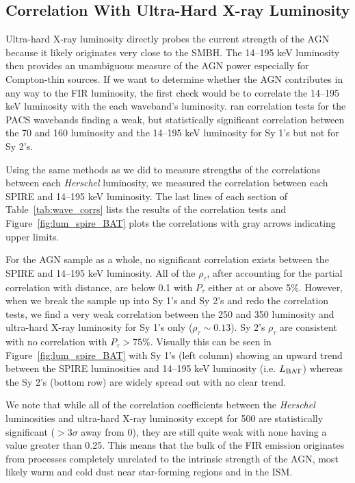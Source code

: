 \subsection{Correlation With Ultra-Hard X-ray Luminosity}
Ultra-hard X-ray luminosity directly probes the current strength of the AGN because it likely originates very close to the SMBH. The 14--195 keV luminosity then provides an unambiguous measure of the AGN power especially for Compton-thin sources. If we want to determine whether the AGN contributes in any way to the FIR luminosity, the first check would be to correlate the 14--195 keV luminosity with the each waveband's luminosity. \citet{Melendez:2014yu} ran correlation tests for the PACS wavebands finding a weak, but statistically significant correlation between the 70 and 160 \um{} luminosity and the 14--195 keV luminosity for Sy 1's but not for Sy 2's.

Using the same methods as we did to measure strengths of the correlations between each \textit{Herschel} luminosity, we measured the correlation between each SPIRE and 14--195 keV luminosity. The last lines of each section of Table~\ref{tab:wave_corrs} lists the results of the correlation tests and Figure~\ref{fig:lum_spire_BAT} plots the correlations with gray arrows indicating upper limits.

For the AGN sample as a whole, no significant correlation exists between the SPIRE and 14--195 keV luminosity. All of the $\rho_{\tau}$, after accounting for the partial correlation with distance, are below 0.1 with $P_{\tau}$ either at or above 5\%. However, when we break the sample up into Sy 1's and Sy 2's and redo the correlation tests, we find a very weak correlation between the 250 and 350 \um{} luminosity and ultra-hard X-ray luminosity for Sy 1's only ($\rho_{\tau}\sim0.13$). Sy 2's $\rho_{\tau}$ are consistent with no correlation with $P_{\tau}>75\%$. Visually this can be seen in Figure~\ref{fig:lum_spire_BAT} with Sy 1's (left column) showing an upward trend between the SPIRE luminosities and 14--195 keV luminosity (i.e. $L_{\rm BAT}$) whereas the Sy 2's (bottom row) are widely spread out with no clear trend.

We note that while all of the correlation coefficients between the \textit{Herschel} luminosities and ultra-hard X-ray luminosity except for 500 \um{} are statistically significant ($>3\sigma$ away from 0), they are still quite weak with none having a value greater than 0.25. This means that the bulk of the FIR emission originates from processes completely unrelated to the intrinsic strength of the AGN, most likely warm and cold dust near star-forming regions and in the ISM.
  
  
  